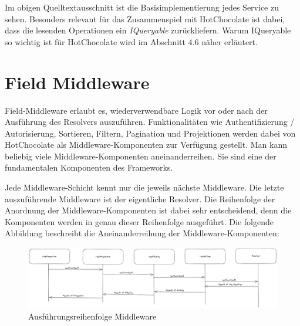 Im obigen Quelltextausschnitt ist die Basisimplementierung jedes Service zu sehen.
Besonders relevant für das Zusammenspiel mit HotChocolate ist dabei, dass die lesenden Operationen ein \textit{IQueryable} zurückliefern.
Warum IQueryable so wichtig ist für HotChocolate wird im Abschnitt 4.6 näher erläutert.

\section{Field Middleware}
Field-Middleware erlaubt es, wiederverwendbare Logik vor oder nach der Ausführung des Resolvers auszuführen.
Funktionalitäten wie Authentifizierung / Autorisierung, Sortieren, Filtern, Pagination und Projektionen werden dabei von HotChocolate als Middleware-Komponenten zur Verfügung gestellt. 
Man kann beliebig viele Middleware-Komponenten aneinanderreihen.
Sie sind eine der fundamentalen Komponenten des Frameworks.


Jede Middleware-Schicht kennt nur die jeweils nächste Middleware.
Die letzte auszuführende Middleware ist der eigentliche Resolver.
Die Reihenfolge der Anordnung der Middleware-Komponenten ist dabei sehr entscheidend, denn die Komponenten werden in genau dieser Reihenfolge ausgeführt.
Die folgende Abbildung beschreibt die Aneinanderreihung der Middleware-Komponenten:

\begin{figure}[H]
    \includegraphics[width=\textwidth]{pics/middleware.png}
    \caption{Ausführungsreihenfolge Middleware}
\end{figure}

